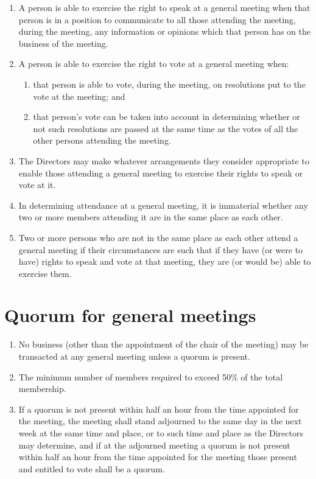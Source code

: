 \documentclass[a4paper,12pt]{article}
\begin{document}
\begin{enumerate}
  \item A person is able to exercise the right to speak at a general meeting when that person is in a position to communicate to all those attending the meeting, during the meeting, any information or opinions which that person has on the business of the meeting.
  \item A person is able to exercise the right to vote at a general meeting when:
  \begin{enumerate}
    \item that person is able to vote, during the meeting, on resolutions put to the vote at the meeting; and
    \item that person’s vote can be taken into account in determining whether or not such resolutions are passed at the same time as the votes of all the other persons attending the meeting.
  \end{enumerate}
  \item The Directors may make whatever arrangements they consider appropriate to enable those attending a general meeting to exercise their rights to speak or vote at it.
  \item In determining attendance at a general meeting, it is immaterial whether any two or more members attending it are in the same place as each other.
  \item Two or more persons who are not in the same place as each other attend a general meeting if their circumstances are such that if they have (or were to have) rights to speak and vote at that meeting, they are (or would be) able to exercise them.
\end{enumerate}

\section{Quorum for general meetings}

\begin{enumerate}
  \item No business (other than the appointment of the chair of the meeting) may be transacted at any general meeting unless a quorum is present.
  \item The minimum number of members required to exceed 50\% of the total membership. %
  \item If a quorum is not present within half an hour from the time appointed for the meeting, the meeting shall stand adjourned to the same day in the next week at the same time and place, or to such time and place as the Directors may determine, and if at the adjourned meeting a quorum is not present within half an hour from the time appointed for the meeting those present and entitled to vote shall be a quorum.
\end{enumerate}
\end{document}
